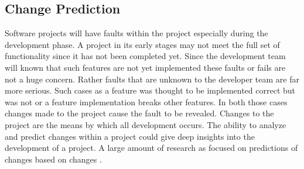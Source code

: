 


\subsection{Change Prediction}

Software projects will have faults within the project especially during the development phase. A project in its early stages may not meet the full set of functionality since it has not been completed yet. Since the development team will known that such features are not yet implemented these faults or fails are not a huge concern. Rather faults that are unknown to the developer team are far more serious. Such cases as a feature was thought to be implemented correct but was not or a feature implementation breaks other features. In both those cases changes made to the project cause the fault to be revealed. Changes to the project are the means by which all development occurs. The ability to analyze and predict changes within a project could give deep insights into the development of a project. A large amount of research as focused on predictions of changes based on changes \cite{Bantelay2013, Chaturvedi2014, Giger2012, Hassan2004, Kagdi2007, Ying2004}.

